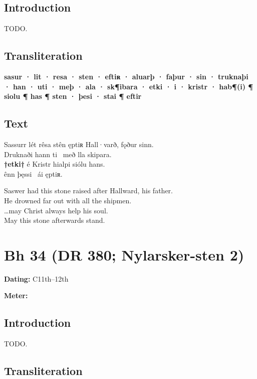 \subsection{Introduction}

TODO.

\subsection{Transliteration}

\textbf{sasur · lit · resa · sten · eftiʀ · aluarþ · faþur · sin · truknaþi · han · uti · meþ · ala · sk¶ibara · etki · i · kristr · hab¶(i) ¶ siolu ¶ has ¶ sten · þesi · stai ¶ eftir}

\subsection{Text}

\bpg\bpa[0]%
\startsub Sassurr lét rêsa stên ęptiʀ Hall·varð, fǫður sinn.\endsub \\
Druknaði hann ti \hld\ með lla skipara. \\
\textbf{†etki†} é Kristr hialpi siólu hans. \\
ênn þęssi \hld\ ái ęptiʀ.\epa

\bpb Saswer had this stone raised after Hallward, his father. \\
He drowned far out with all the shipmen. \\
\dots may Christ always help his soul. \\
May this stone afterwards stand.\epb\epg

\sectionline\newpage


\section{Bh 34 (DR 380; Nylarsker-sten 2)}

\begin{flushright}%
\textbf{Dating:} C11th--12th

\textbf{Meter:} \Fornyrdislag
\end{flushright}%

\subsection{Introduction}

TODO.

\subsection{Transliteration}

